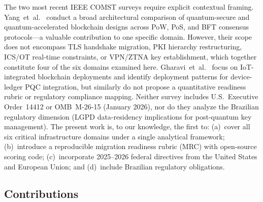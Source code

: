 \documentclass[journal]{IEEEtran}
\begin{document}
The two most recent IEEE COMST surveys require explicit contextual framing.
Yang~et~al.~\cite{yang2024survey} conduct a broad architectural comparison of
quantum-secure and quantum-accelerated blockchain designs across PoW, PoS, and
BFT consensus protocols---a valuable contribution to one specific domain.
However, their scope does not encompass TLS handshake migration, PKI hierarchy
restructuring, ICS/OT real-time constraints, or VPN/ZTNA key establishment,
which together constitute four of the six domains examined here.
Gharavi~et~al.~\cite{gharavi2024postquantum} focus on IoT-integrated blockchain
deployments and identify deployment patterns for device-ledger PQC integration,
but similarly do not propose a quantitative readiness rubric or regulatory
compliance mapping. Neither survey includes U.S.\ Executive Order~14412 or
OMB~M-26-15 (January 2026), nor do they analyze the Brazilian regulatory
dimension (LGPD data-residency implications for post-quantum key management).
The present work is, to our knowledge, the first to: (a)~cover all six critical
infrastructure domains under a single analytical framework; (b)~introduce a
reproducible migration readiness rubric (MRC) with open-source scoring code;
(c)~incorporate 2025--2026 federal directives from the United States and
European Union; and (d)~include Brazilian regulatory obligations.

\subsection{Contributions}
\end{document}
